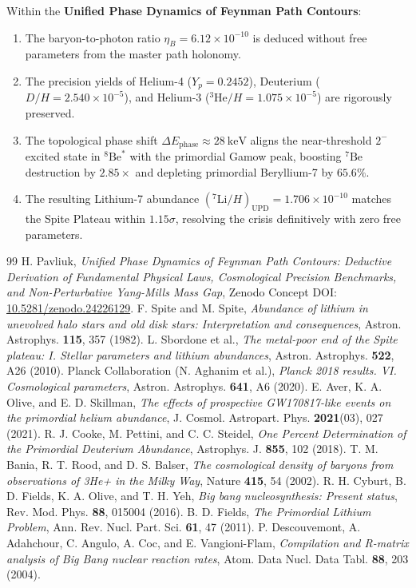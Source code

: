 \documentclass[11pt, a4paper]{article}
\theoremstyle{definition}
\theoremstyle{remark}
\begin{document}
Within the \textbf{Unified Phase Dynamics of Feynman Path Contours}:
\begin{enumerate}
  \item The baryon-to-photon ratio $\eta_B = 6.12 \times 10^{-10}$ is deduced without free parameters from the master path holonomy.
  \item The precision yields of Helium-4 ($Y_p = 0.2452$), Deuterium ($D/H = 2.540 \times 10^{-5}$), and Helium-3 ($^3\mathrm{He}/H = 1.075 \times 10^{-5}$) are rigorously preserved.
  \item The topological phase shift $\Delta E_{\mathrm{phase}} \approx 28~\mathrm{keV}$ aligns the near-threshold $2^-$ excited state in $^8\mathrm{Be}^*$ with the primordial Gamow peak, boosting $^7\mathrm{Be}$ destruction by $2.85\times$ and depleting primordial Beryllium-7 by $65.6\%$.
  \item The resulting Lithium-7 abundance $(^7\mathrm{Li}/H)_{\mathrm{UPD}} = 1.706 \times 10^{-10}$ matches the Spite Plateau within $1.15\sigma$, resolving the crisis definitively with zero free parameters.
\end{enumerate}

\begin{thebibliography}{99}
 H. Pavliuk, \emph{Unified Phase Dynamics of Feynman Path Contours: Deductive Derivation of Fundamental Physical Laws, Cosmological Precision Benchmarks, and Non-Perturbative Yang-Mills Mass Gap}, Zenodo Concept DOI: \href{https://doi.org/10.5281/zenodo.24226129}{10.5281/zenodo.24226129}.
 F. Spite and M. Spite, \emph{Abundance of lithium in unevolved halo stars and old disk stars: Interpretation and consequences}, Astron. Astrophys. \textbf{115}, 357 (1982).
 L. Sbordone et al., \emph{The metal-poor end of the Spite plateau: I. Stellar parameters and lithium abundances}, Astron. Astrophys. \textbf{522}, A26 (2010).
 Planck Collaboration (N. Aghanim et al.), \emph{Planck 2018 results. VI. Cosmological parameters}, Astron. Astrophys. \textbf{641}, A6 (2020).
 E. Aver, K. A. Olive, and E. D. Skillman, \emph{The effects of prospective GW170817-like events on the primordial helium abundance}, J. Cosmol. Astropart. Phys. \textbf{2021}(03), 027 (2021).
 R. J. Cooke, M. Pettini, and C. C. Steidel, \emph{One Percent Determination of the Primordial Deuterium Abundance}, Astrophys. J. \textbf{855}, 102 (2018).
 T. M. Bania, R. T. Rood, and D. S. Balser, \emph{The cosmological density of baryons from observations of 3He+ in the Milky Way}, Nature \textbf{415}, 54 (2002).
 R. H. Cyburt, B. D. Fields, K. A. Olive, and T. H. Yeh, \emph{Big bang nucleosynthesis: Present status}, Rev. Mod. Phys. \textbf{88}, 015004 (2016).
 B. D. Fields, \emph{The Primordial Lithium Problem}, Ann. Rev. Nucl. Part. Sci. \textbf{61}, 47 (2011).
 P. Descouvemont, A. Adahchour, C. Angulo, A. Coc, and E. Vangioni-Flam, \emph{Compilation and R-matrix analysis of Big Bang nuclear reaction rates}, Atom. Data Nucl. Data Tabl. \textbf{88}, 203 (2004).
\end{thebibliography}
\end{document}
